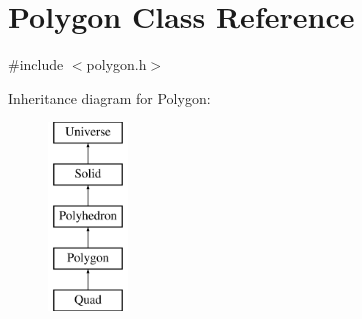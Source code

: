 \hypertarget{classPolygon}{}\section{Polygon Class Reference}
\label{classPolygon}


{\ttfamily \#include $<$polygon.\+h$>$}

Inheritance diagram for Polygon\+:\begin{figure}[H]
\begin{center}
\leavevmode
\includegraphics[height=5.000000cm]{classPolygon}
\end{center}
\end{figure}
